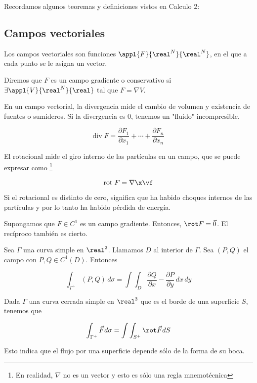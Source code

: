 Recordamos algunos teoremas y definiciones vistos en Calculo 2:

\subsection{Campos vectoriales}
Los campos vectoriales son funciones $\appl{F}{\real^N}{\real^N}$, en el que a cada punto se le asigna un vector.

\begin{defn}
Diremos que $F$ es un campo gradiente o conservativo si $\exists \appl{V}{\real^N}{\real}$ tal que $F=\nabla V$.
\end{defn}

\begin{defn}[Divergencia]
En un campo vectorial, la divergencia mide el cambio de volumen y existencia de fuentes o sumideros. Si la divergencia es 0, tenemos un "fluido" incompresible.

\[ \textrm{div}\;F = \frac{∂F_1}{∂x_1} + \cdots + \frac{∂F_n}{∂x_n} \]
\end{defn}

\begin{defn}[Rotacional]
El rotacional mide el giro interno de las partículas en un campo, que se puede expresar como \footnote{En realidad, $\nabla$ no es un vector y esto es sólo una regla mnemotécnica}

\[ \textrm{rot}\;F = \nabla \x \vf \]

Si el rotacional es distinto de cero, significa que ha habido choques internos de las partículas y por lo tanto ha habido pérdida de energía.
\end{defn}

\begin{theorem}
Supongamos que $F\in C^1$ es un campo gradiente. Entonces, $\rot F = \vec{0}$. El recíproco también es cierto.
\end{theorem}


\begin{theorem}
Sea $\Gamma$ una curva simple en $\real^2$. Llamamos $D$ al interior de $\Gamma$. Sea $(P,Q)$ el campo con $P,Q\in C^1(D)$. Entonces

\[ \int_{\Gamma^+} (P,Q)\,d\sigma = \int\int_D \frac{\partial Q}{\partial x}-\frac{\partial P}{\partial y}\,dx\,dy\]
\end{theorem}

\begin{theorem}
Dada $\Gamma$ una curva cerrada simple en $\real^3$ que es el borde de una superficie $S$, tenemos que 

\[ \int_{\Gamma^+}\vec{F}d\sigma =\int\int_{S^+}\rot \vec{F}dS \]

Esto indica que el flujo por una superficie depende sólo de la forma de su boca.
\end{theorem}

